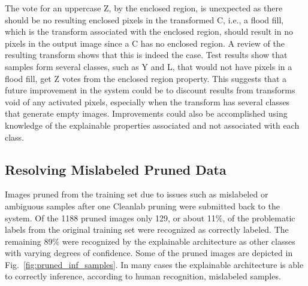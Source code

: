 \documentclass[conference]{IEEEtran}
\begin{document}
The vote for an uppercase Z, by the enclosed region, is unexpected
as there should be no resulting enclosed pixels in the transformed C,
i.e., a flood fill, which is the transform associated with the enclosed region,
should result in no pixels in the output image since a C has no enclosed region.
A review of the resulting transform shows that this is indeed the case.  Test
results show that samples form several classes, such as Y and L, that would not
have pixels in a flood fill, get Z votes from the enclosed region property.  This
suggests that a future improvement in the system could be to discount results
from transforms void of any activated pixels, especially when the transform has
several classes that generate empty images.  Improvements could also be
accomplished using knowledge of the explainable properties associated and not
associated with each class.



\subsection{Resolving Mislabeled Pruned Data}
\label{results:resolving}

Images pruned from the training set due to issues such as mislabeled or
ambiguous samples after one Cleanlab pruning were submitted back to the system.  
Of the 1188 pruned images only 129, or about 11\%, of the problematic labels from
the original training set were recognized as correctly labeled.  The remaining
89\% were recognized by the explainable architecture as other classes with
varying degrees of confidence. Some of the pruned images are depicted in
Fig.~\ref{fig:pruned_inf_samples}.  In many cases the explainable architecture is
able to correctly inference, according to human recognition, mislabeled samples.
\end{document}
